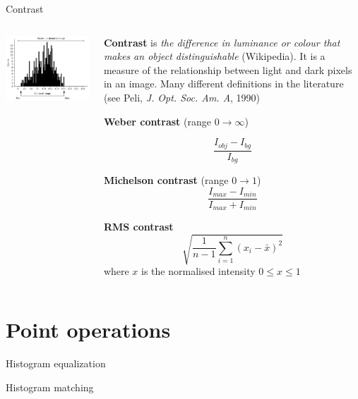 \documentclass[9pt, aspectratio=169]{beamer}
\begin{document}
\begin{frame}
    {Contrast}
    \begin{columns}
        \begin{column}{.4\textwidth}
            \includegraphics[width=\textwidth]{contrast range.png}
        \end{column}
        \begin{column}{.6\textwidth}
            \textbf{Contrast} is \textit{the difference in luminance or colour that makes an object distinguishable} (Wikipedia). It is a measure of the relationship between light and dark pixels in an image. 
            \pause
            Many different definitions in the literature (see Peli, \textit{J. Opt. Soc. Am. A}, 1990)
            
            \textbf{Weber contrast} (range $0 \rightarrow \infty$)

            $$\frac{I_{obj}-I_{bg}}{I_{bg}}$$

            \textbf{Michelson contrast} (range $0 \rightarrow 1$)
            $$\frac{I_{max}-I_{min}}{I_{max}+I_{min}}$$

            \textbf{RMS contrast}
            $$\sqrt{\frac{1}{n-1}\sum_{i=1}^{n}(x_i-\bar{x})^2}$$ where $x$ is the normalised intensity $0 \leq x \leq 1$

        \end{column}
    \end{columns}
\end{frame}

\section {Point operations}

\begin{frame}
{Histogram equalization}
\end{frame}

\begin{frame}
{Histogram matching}
\end{frame}
\end{document}
